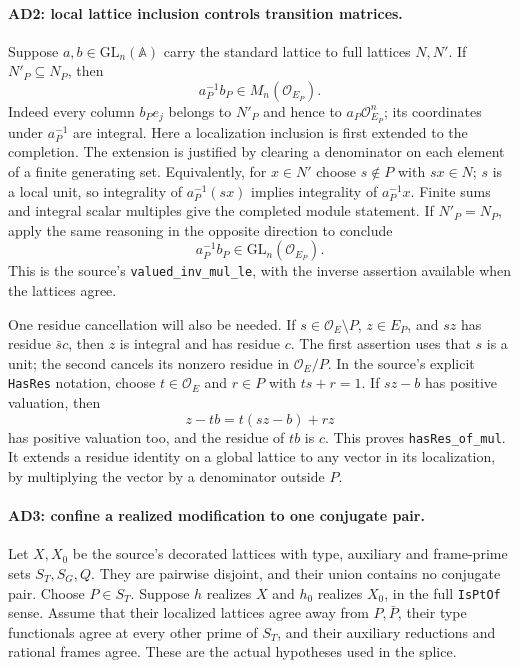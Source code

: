 \documentclass[11pt,a4paper]{article}
\numberwithin{equation}{section}
\theoremstyle{remark}\newtheorem{remark}[theorem]{Remark}
\begin{document}
\paragraph{AD2: local lattice inclusion controls transition matrices.}
Suppose $a,b\in\mathrm{GL}_n(\mathbb A)$ carry the standard
lattice to full lattices $N,N'$. If $N'_P\subseteq N_P$, then
\[
                      a_P^{-1}b_P\in M_n(\mathcal O_{E_P}).
                                                               \tag{AD.6}
\]
Indeed every column $b_Pe_j$ belongs to $N'_P$ and hence to
$a_P\mathcal O_{E_P}^n$; its coordinates under $a_P^{-1}$
are integral. Here a localization inclusion is first extended
to the completion. The extension is justified by clearing a
denominator on each element of a finite generating set.
Equivalently, for $x\in N'$ choose $s\notin P$ with
$sx\in N$; $s$ is a local unit, so integrality of
$a_P^{-1}(sx)$ implies integrality of $a_P^{-1}x$.
Finite sums and integral scalar multiples give the completed
module statement. If $N'_P=N_P$, apply the same reasoning in
the opposite direction to conclude
\[
                      a_P^{-1}b_P\in\mathrm{GL}_n(\mathcal O_{E_P}).
                                                               \tag{AD.7}
\]
This is the source's \texttt{valued\_\allowbreak inv\_\allowbreak mul\_\allowbreak le}, with the
inverse assertion available when the lattices agree.

One residue cancellation will also be needed. If $s\in\mathcal O_E
\setminus P$, $z\in E_P$, and $sz$ has residue $\bar s c$,
then $z$ is integral and has residue $c$. The first assertion
uses that $s$ is a unit; the second cancels its nonzero residue
in $\mathcal O_E/P$. In the source's explicit \texttt{HasRes}
notation, choose $t\in\mathcal O_E$ and $r\in P$ with
$ts+r=1$. If $sz-b$ has positive valuation, then
\[
             z-tb=t(sz-b)+rz                         \tag{AD.8}
\]
has positive valuation too, and the residue of $tb$ is $c$.
This proves \texttt{hasRes\_\allowbreak of\_\allowbreak mul}. It extends a residue
identity on a global lattice to any vector in its localization,
by multiplying the vector by a denominator outside $P$.

\paragraph{AD3: confine a realized modification to one conjugate pair.}
Let $X,X_0$ be the source's decorated lattices with type, auxiliary
and frame-prime sets $S_T,S_G,Q$. They are pairwise disjoint,
and their union contains no conjugate pair. Choose $P\in S_T$.
Suppose $h$ realizes $X$ and $h_0$ realizes $X_0$, in the full
\texttt{IsPtOf} sense. Assume that their localized lattices agree
away from $P,\bar P$, their type functionals agree at every
other prime of $S_T$, and their auxiliary reductions and rational
frames agree. These are the actual hypotheses used in the splice.
\end{document}
